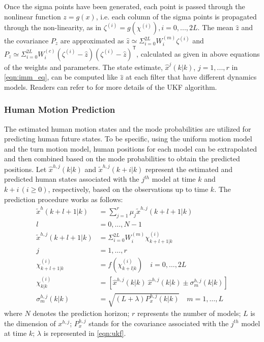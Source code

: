\documentclass[letterpaper, 10 pt, conference]{ieeeconf}
\newcommand{\todoQ}[1]{\vspace{0px} %
	\todo[inline, color=orange!50]{\textbf{[Note:]} {#1}} %
}
\begin{document}
	Once the sigma points have been generated, each point is passed through the nonlinear function $z=g(x)$, i.e. each column of the sigma points is propagated through the non-linearity, as in $\zeta^{(i)}=g(\chi^{(i)}), i=0,...,2L$. The mean $\hat{z}$ and the covariance $P_z$ are approximated as $\hat{z}\simeq \Sigma_{i=0}^{2L}W_i^{(m)} \zeta^{(i)}$ and $P_z \simeq  \Sigma_{i=0}^{2L}W_i^{(c)}(\zeta^{(i)}-\hat{z})(\zeta^{(i)}-\hat{z})^\mathsf{T}$, calculated as given in above equations of the weights and parameters\cite{hong2013vehicle}. The state estimate, $\hat{x}^j(k|k)$, $j=1,...,r$ in \cref{eqn:imm_eq}, can be computed like $\hat{z}$ at each filter that have different dynamics models. Readers can refer to \cite {haykin2004kalman} for more details of the UKF algorithm.
	
	\subsubsection{Human Motion Prediction}\label{subsec:motion_pred}
	The estimated human motion states and the mode probabilities are utilized for predicting human future states.
	To be specific, using the uniform motion model and the turn motion model, human positions for each model can be extrapolated and then combined based on the mode probabilities to obtain the predicted positions.
	Let $\hat{x}^{h,j}(k|k)$ and $\tilde{x}^{h,j}(k+i|k)$ represent the estimated and predicted human states associated with the $j^{th}$ model at time $k$ and $k+i\,(i\ge 0)$, respectively, based on the observations up to time $k$.
	The prediction procedure works as follows:
	\begin{subequations}\label{eqn:motion_pred_imm}
		\begin{align}
			\tilde{x}^h(k+l+1|k)&=\sum\limits_{j=1}^{r}\mu_j \tilde{x}^{h,j}(k+l+1|k)\\ l&=0,\dots,N-1\nonumber \\
			\tilde{x}^{h,j}(k+l+1|k)&=\Sigma_{i=0}^{2L}W_i^{(m)} \chi_{k+l+1|k}^{(i)}\\ j&=1,\dots,r\nonumber \\
			\chi_{k+l+1|k}^{(i)}&=f(\chi_{k+l|k}^{(i)}) \quad i=0,\dots, 2L\\
			\chi_{k|k}^{(i)}&=\left[\hat{x}^{h,j}(k|k)\ \hat{x}^{h,j}(k|k) \pm \sigma_{m}^{h,j}(k|k) \right]\\
			\sigma^{h,j}_m(k|k)&=\sqrt{(L+\lambda)P_x^{h,j}(k|k)} \quad m=1,\dots,L 
		\end{align}
	\end{subequations}
	where $N$ denotes the prediction horizon; $r$ represents the number of models; $L$ is the dimension of $x^{h,j}$; $P_x^{h,j}$ stands for the covariance associated with the $j^{th}$ model at time $k$; $\lambda$ is represented in \cref{eqn:ukf}.
	
\end{document}
